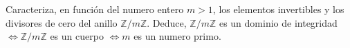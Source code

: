 \question
Caracteriza, en función del numero entero $m > 1$, los elementos invertibles y 
los divisores de cero del anillo $\mathbb{Z}/m\mathbb{Z}$.
Deduce, $\mathbb{Z}/m\mathbb{Z}$ es un dominio de integridad 
$\iff \mathbb{Z}/m\mathbb{Z}$ es un cuerpo 
$\iff m$ es un numero primo.